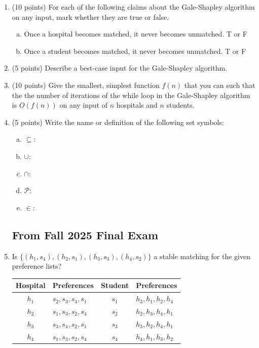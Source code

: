 \documentclass[11pt]{article}
\begin{document}
\begin{enumerate}
\item (10 points) For each of the following claims about the Gale-Shapley
algorithm on any input, mark whether they are true or false. 
\begin{enumerate}[(a)]
    \item Once a hospital becomes matched, it never becomes unmatched. T or F
    \item Once a student becomes matched, it never becomes unmatched. T or F
\end{enumerate}

\item (5 points)
Describe a best-case input for the Gale-Shapley algorithm.

\vspace{1in}

\item (10 points) Give the smallest, simplest function $f(n)$ that you can such
that the the number of iterations of the while loop in the Gale-Shapley
algorithm is $O(f(n))$ on any input of $n$ hospitals and $n$ students. 

\vspace{1in}

\item (5 points) Write the name or definition of the following set symbols:
    \begin{enumerate}[(a)]
        \item $\subseteq$:
        \item $\cup$:
        \item $\cap$:
        \item $\mathcal{P}$:
        \item $\in$:
    \end{enumerate}



\newpage
\subsection*{From Fall 2025 Final Exam}

\item Is $\{(h_1, s_4), (h_2, s_1), (h_3, s_3), (h_4, s_2)\}$ a stable matching for the given preference lists?

\begin{table}[h]
\centering
\begin{tabular}{c | l || c | l}
\textbf{Hospital} & \textbf{Preferences} & \textbf{Student} & \textbf{Preferences} \\
\hline
$h_1$ & $s_2 , s_3 , s_4 , s_1$ & $s_1$ & $h_3 , h_1 , h_2 , h_4$ \\
$h_2$ & $s_1 , s_3 , s_2 , s_4$ & $s_2$ & $h_2 , h_3 , h_4 , h_1$ \\
$h_3$ & $s_3 , s_4 , s_2 , s_1$ & $s_3$ & $h_3 , h_2 , h_4 , h_1$ \\
$h_4$ & $s_1 , s_3 , s_2 , s_4$ & $s_4$ & $h_4 , h_1 , h_3 , h_2$ \\
\end{tabular}
\end{table}


\end{enumerate}
\end{document}
